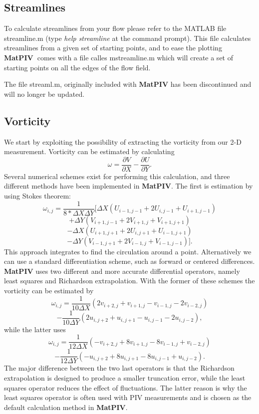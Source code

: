 \documentclass{book}
\newcommand{\matpiv}{{\bf MatPIV~}}
\begin{document}
\subsection{Streamlines}

To calculate streamlines from your flow please refer to the MATLAB file
streamline.m (type {\em help streamline} at the command prompt). This
file calculates streamlines from a given set of starting points, and to
ease the plotting \matpiv comes with a file calles mstreamline.m which
will create a set of starting points on all the edges of the flow field.

The file streaml.m, originally included with {\bf MatPIV} has been
discontinued and will no longer be updated.

\subsection{Vorticity}
We start by exploiting the possibility of extracting the vorticity
from our 2-D measurement. Vorticity can be estimated by calculating
\[ \omega = \frac{\partial V}{\partial X} - \frac{\partial U}{\partial Y}. 
\]
Several numerical schemes exist for performing this calculation, and three
different methods have been implemented in {\bf MatPIV}. The first is
estimation by using Stokes theorem:
\[ \omega_{i,j} = \frac{1}{8*\Delta{X} \Delta{Y}} [\Delta{X}(U_{i-1,j-1} 
+2U_{i,j-1}+U_{i+1,j-1}) \]
\[+ \Delta{Y}(V_{i+1,j-1} +2V_{i+1,j}+V_{i+1,j+1}) \] 
\[- \Delta{X}(U_{i+1,j+1} +2U_{i,j+1}+U_{i-1,j+1})  \]
\[- \Delta{Y}(V_{i-1,j+1} +2V_{i-1,j}+V_{i-1,j-1})]. \]
This approach integrates to find the circulation around a
point. Alternatively we can use a standard differentiation scheme,
such as forward or centered differences. {\bf MatPIV} uses two
different and more accurate differential operators, namely least
squares and Richardson extrapolation. With the former of these schemes
the vorticity can be estimated by
\[ \omega_{i,j} = \frac{1}{10\Delta X} (2v_{i+2,j} +v_{i+1,j} -v_{i-1,j} -2v_{i-2,j})\]
\[- \frac{1}{10\Delta Y} (2u_{i,j+2}+u_{i,j+1} -u_{i,j-1} -2u_{i,j-2}),\]
while the latter uses
\[ \omega_{i,j} = \frac{1}{12\Delta X} (-v_{i+2,j} +8v_{i+1,j} -8v_{i-1,j} +v_{i-2,j})\]
\[- \frac{1}{12\Delta Y} (-u_{i,j+2}+8u_{i,j+1} -8u_{i,j-1} +u_{i,j-2}).\]
The major difference between the two last operators is that the
Richardson extrapolation is designed to produce a smaller truncation
error, while the least squares operator reduces the effect of
fluctuations. The latter reason is why the least squares operator is
often used with PIV measurements and is chosen as the default
calculation method in {\bf MatPIV}.
\end{document}
